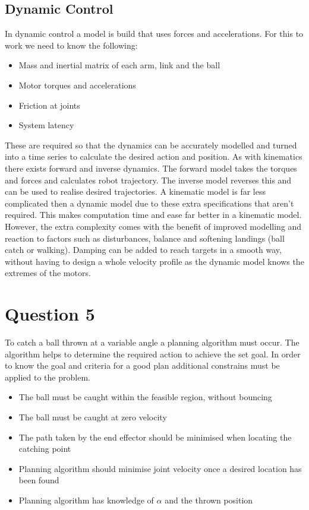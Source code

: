 \documentclass[twoside,twocolumn]{article}
\begin{document}
\subsection{Dynamic Control} 
In dynamic control a model is build that uses forces and accelerations. For this to work we need to know the following:
\begin{itemize}
\item Mass and inertial matrix of each arm, link and the ball
\item Motor torques and accelerations 
\item Friction at joints
\item System latency
\end{itemize}
These are required so that the dynamics can be accurately modelled and turned into a time series to calculate the desired action and position.
As with kinematics there exists forward and inverse dynamics. The forward model takes the torques and forces and calculates robot trajectory. The inverse model reverses this and can be used to realise desired trajectories.
\newline
A kinematic model is far less complicated then a dynamic model due to these extra specifications that aren't required. This makes computation time and ease far better in a kinematic model. However, the extra complexity comes with the benefit of improved modelling and reaction to factors such as disturbances, balance and softening landings (ball catch or walking). Damping can be added to reach targets in a smooth way, without having to design a whole velocity profile as the dynamic model knows the extremes of the motors.

\section{Question 5}
To catch a ball thrown at a variable angle a planning algorithm must occur. The algorithm helps to determine the required action to achieve the set goal. In order to know the goal and criteria for a good plan additional constrains must be applied to the problem.

\begin{itemize}
\item The ball must be caught within the feasible region, without bouncing
\item The ball must be caught at zero velocity
\item The path taken by the end effector should be minimised when locating the catching point
\item Planning algorithm should minimise joint velocity once a desired location has been found
\item Planning algorithm has knowledge of $\alpha$ and the thrown position
\end{itemize}
\end{document}
